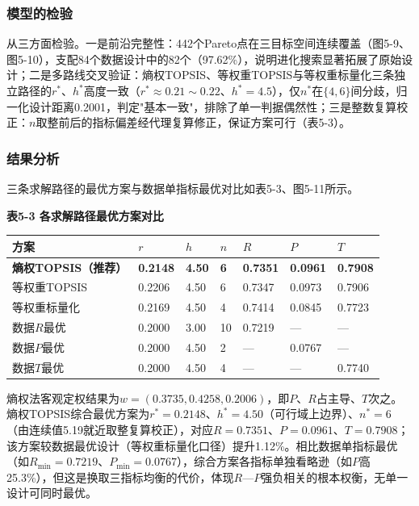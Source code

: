 \documentclass[withoutpreface]{cumcmthesis}
\begin{document}
\subsubsection{模型的检验}
从三方面检验。一是前沿完整性：442个Pareto点在三目标空间连续覆盖（图5-9、图5-10），支配84个数据设计中的82个（97.62\%），说明进化搜索显著拓展了原始设计；二是多路线交叉验证：熵权TOPSIS、等权重TOPSIS与等权重标量化三条独立路径的$r^*$、$h^*$高度一致（$r^*\approx0.21\sim0.22$、$h^*=4.5$），仅$n^*$在$\{4,6\}$间分歧，归一化设计距离0.2001，判定"基本一致"，排除了单一判据偶然性；三是整数复算校正：$n$取整前后的指标偏差经代理复算修正，保证方案可行（表5-3）。

\subsubsection{结果分析}
三条求解路径的最优方案与数据单指标最优对比如表5-3、图5-11所示。

\textbf{表5-3 各求解路径最优方案对比}

\begin{table}[htbp]
\centering
\small
\begin{tabularx}{\textwidth}{XXXXXXX}
\toprule
方案 & $r$ & $h$ & $n$ & $R$ & $P$ & $T$ \\
\midrule
\textbf{熵权TOPSIS（推荐）} & \textbf{0.2148} & \textbf{4.50} & \textbf{6} & \textbf{0.7351} & \textbf{0.0961} & \textbf{0.7908} \\
等权重TOPSIS & 0.2206 & 4.50 & 6 & 0.7347 & 0.0973 & 0.7906 \\
等权重标量化 & 0.2169 & 4.50 & 4 & 0.7414 & 0.0845 & 0.7723 \\
数据$R$最优 & 0.2000 & 3.00 & 10 & 0.7219 & — & — \\
数据$P$最优 & 0.2000 & 4.50 & 2 & — & 0.0767 & — \\
数据$T$最优 & 0.2000 & 4.50 & 4 & — & — & 0.7740 \\
\bottomrule
\end{tabularx}
\end{table}
熵权法客观定权结果为$w=(0.3735,0.4258,0.2006)$，即$P$、$R$占主导、$T$次之。熵权TOPSIS综合最优方案为$r^*=0.2148$、$h^*=4.50$（可行域上边界）、$n^*=6$（由连续值5.19就近取整复算校正），对应$R=0.7351$、$P=0.0961$、$T=0.7908$；该方案较数据最优设计（等权重标量化口径）提升1.12\%。相比数据单指标最优（如$R_{\min}=0.7219$、$P_{\min}=0.0767$），综合方案各指标单独看略逊（如$P$高25.3\%），但这是换取三指标均衡的代价，体现$R$—$P$强负相关的根本权衡，无单一设计可同时最优。
\end{document}
